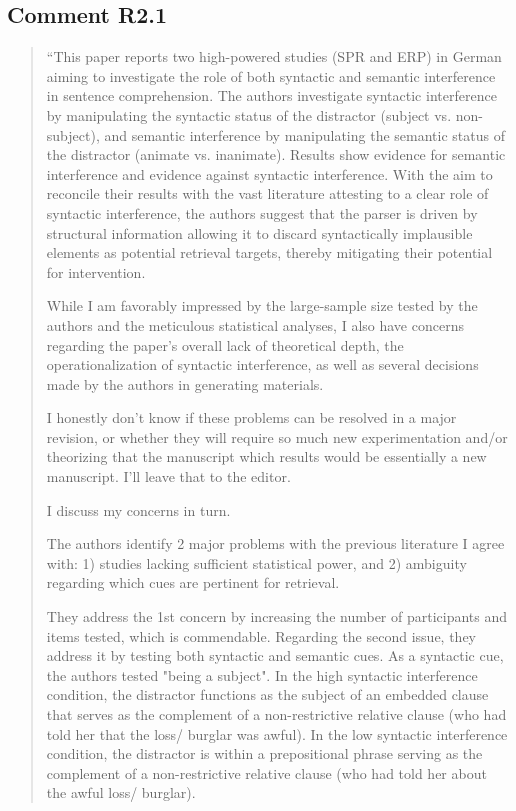 \documentclass[12pt]{article}
\begin{document}
\subsection*{Comment R2.1}
\begin{quote}
``This paper reports two high-powered studies (SPR and ERP) in German aiming to investigate the role of both syntactic and semantic interference in sentence comprehension. The authors investigate syntactic interference by manipulating the syntactic status of the distractor (subject vs. non-subject), and semantic interference by manipulating the semantic status of the distractor (animate vs. inanimate). Results show evidence for semantic interference and evidence against syntactic interference. With the aim to reconcile their results with the vast literature attesting to a clear role of syntactic interference, the authors suggest that the parser is driven by structural information allowing it to discard syntactically implausible elements as potential retrieval targets, thereby mitigating their potential for intervention.

While I am favorably impressed by the large-sample size tested by the authors and the meticulous statistical analyses, I also have concerns regarding the paper's overall lack of theoretical depth, the operationalization of syntactic interference, as well as several decisions made by the authors in generating materials.

I honestly don't know if these problems can be resolved in a major revision, or whether they will require so much new experimentation and/or theorizing that the manuscript which results would be essentially a new manuscript. I'll leave that to the editor.

I discuss my concerns in turn.

The authors identify 2 major problems with the previous literature I agree with: 1) studies lacking sufficient statistical power, and 2) ambiguity regarding which cues are pertinent for retrieval.

They address the 1st concern by increasing the number of participants and items tested, which is commendable. Regarding the second issue, they address it by testing both syntactic and semantic cues. As a syntactic cue, the authors tested "being a subject". In the high syntactic interference condition, the distractor functions as the subject of an embedded clause that serves as the complement of a non-restrictive relative clause (who had told her that the loss/ burglar was awful). In the low syntactic interference condition, the distractor is within a prepositional phrase serving as the complement of a non-restrictive relative clause (who had told her about the awful loss/ burglar).


\end{quote}
\end{document}
